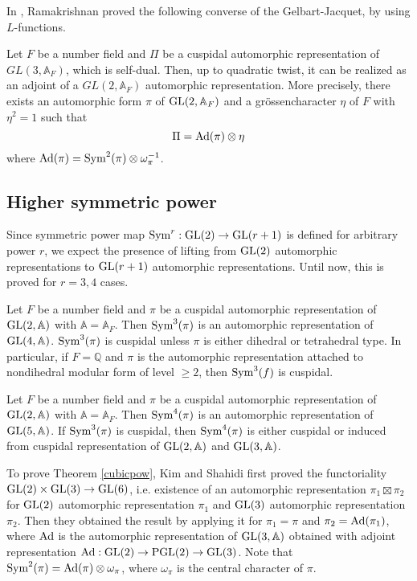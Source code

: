 In \cite{ramakrishnan2014exercise}, Ramakrishnan proved the following converse of the Gelbart-Jacquet, by using $L$-functions.
\begin{theorem}
Let $F$ be a number field and $\Pi$ be a cuspidal automorphic representation of $GL(3, \mathbb{A}_{F})$, which is self-dual.
Then, up to quadratic twist, it can be realized as an adjoint of a $GL(2, \mathbb{A}_{F})$ automorphic representation.
More precisely, there exists an automorphic form $\pi$ of $\operatorname{\mathrm{GL}}(2, \mathbb{A}_{F})$ and a gr\"ossencharacter $\eta$ of $F$ with $\eta^{2} = 1$ such that
$$
\Pi = \operatorname{\mathrm{Ad}}(\pi) \otimes \eta
$$
where $\operatorname{\mathrm{Ad}}(\pi) = \mathrm{Sym}^{2}(\pi) \otimes \omega_{\pi}^{-1}$.
\end{theorem}
\subsection{Higher symmetric power}
Since symmetric power map $\mathrm{Sym}^{r}:\operatorname{\mathrm{GL}}(2) \to \operatorname{\mathrm{GL}}(r+1)$ is defined for arbitrary power $r$, we expect the presence of lifting from $\operatorname{\mathrm{GL}}(2)$ automorphic representations to $\operatorname{\mathrm{GL}}(r+1)$ automorphic representations.
Until now, this is proved for $r = 3, 4$ cases.

\begin{theorem}
\label{cubicpow}
Let $F$ be a number field and $\pi$ be a cuspidal automorphic representation of $\operatorname{\mathrm{GL}}(2, \mathbb{A})$ with $\mathbb{A} = \mathbb{A}_{F}$.
Then $\mathrm{Sym}^{3}(\pi)$ is an automorphic representation of $\operatorname{\mathrm{GL}}(4, \mathbb{A})$.
$\mathrm{Sym}^{3}(\pi)$ is cuspidal unless $\pi$ is either dihedral or tetrahedral type.
In particular, if $F = \mathbb{Q}$ and $\pi$ is the automorphic representation attached to nondihedral modular form of level $\geq 2$, then $\mathrm{Sym}^{3}(f)$ is cuspidal.
\end{theorem}


\begin{theorem}
\label{quarticpow}
Let $F$ be a number field and $\pi$ be a cuspidal automorphic representation of $\operatorname{\mathrm{GL}}(2, \mathbb{A})$ with $\mathbb{A} = \mathbb{A}_{F}$.
Then $\mathrm{Sym}^{4}(\pi)$ is an automorphic representation of $\operatorname{\mathrm{GL}}(5, \mathbb{A})$.
If $\mathrm{Sym}^{3}(\pi)$ is cuspidal, then $\mathrm{Sym}^{4}(\pi)$ is either cuspidal or induced from cuspidal representation of $\operatorname{\mathrm{GL}}(2, \mathbb{A})$ and $\operatorname{\mathrm{GL}}(3, \mathbb{A})$.
\end{theorem}

To prove Theorem \ref{cubicpow}, Kim and Shahidi first proved the functoriality $\operatorname{\mathrm{GL}}(2) \times \operatorname{\mathrm{GL}}(3) \to \operatorname{\mathrm{GL}}(6)$, i.e. existence of an automorphic representation $\pi_{1} \boxtimes \pi_{2}$ for $\operatorname{\mathrm{GL}}(2)$ automorphic representation $\pi_{1}$ and $\operatorname{\mathrm{GL}}(3)$ automorphic representation $\pi_{2}$.
Then they obtained the result by applying it for $\pi_{1} = \pi$ and $\pi_{2}  = \operatorname{\mathrm{Ad}}(\pi_{1})$, where $\operatorname{\mathrm{Ad}}$ is the automorphic representation of $\operatorname{\mathrm{GL}}(3, \mathbb{A})$ obtained with adjoint representation $\operatorname{\mathrm{Ad}}: \operatorname{\mathrm{GL}}(2) \to \operatorname{\mathrm{PGL}}(2) \to \operatorname{\mathrm{GL}}(3)$.
Note that $\mathrm{Sym}^{2}(\pi) = \operatorname{\mathrm{Ad}}(\pi) \otimes \omega_{\pi}$, where $\omega_{\pi}$ is the central character of $\pi$. 

